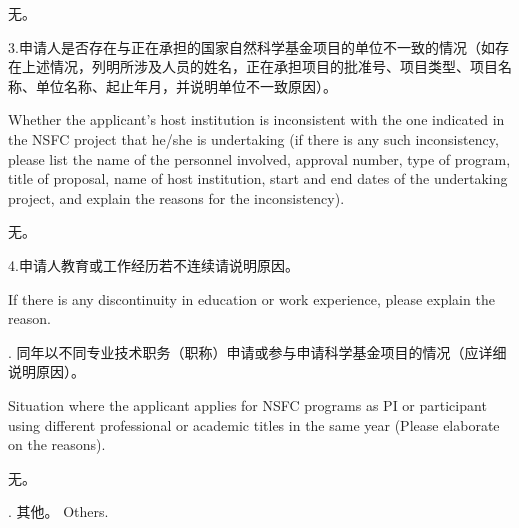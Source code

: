 \documentclass[12pt,UTF8,AutoFakeBold=4,a4paper]{ctexart}
\begin{document}
\bigskip

无。

\bigskip

{\sihao \color{MsBlue} \kaishu 3.申请人是否存在与正在承担的国家自然科学基金项目的单位不一致的情况（如存在上述情况，列明所涉及人员的姓名，正在承担项目的批准号、项目类型、项目名称、单位名称、起止年月，并说明单位不一致原因）。}

\bigskip

{\color{MsBlue} \xiaosihao {} 
Whether the applicant's host institution is inconsistent with the one indicated in the NSFC project that he/she is undertaking (if there is any such inconsistency, please list the name of the personnel involved, approval number, type of program, title of proposal, name of host institution, start and end dates of the undertaking project, and explain the reasons for the inconsistency).}

\bigskip

无。

\bigskip

{\sihao \color{MsBlue} \kaishu 4.申请人教育或工作经历若不连续请说明原因。}

\bigskip

{\color{MsBlue} \xiaosihao {} 
If there is any discontinuity in education or work experience, please explain the reason.}

{\sihao \color{MsBlue} . 同年以不同专业技术职务（职称）申请或参与申请科学基金项目的情况（应详细说明原因）。 

\bigskip

\xiaosihao {} Situation where the applicant applies for NSFC programs as PI or participant using different professional or academic titles in the same year (Please elaborate on the reasons).}

\bigskip

无。

\bigskip

{\sihao \color{MsBlue} . 其他。 
\xiaosihao {} Others.}
\end{document}

